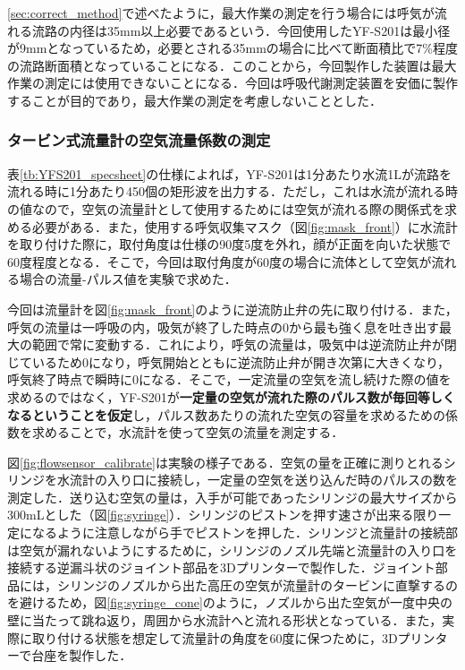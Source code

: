 \ref{sec:correct_method}で述べたように，最大作業の測定を行う場合には呼気が流れる流路の内径は35mm以上必要であるという．今回使用したYF-S201は最小径が9mmとなっているため，必要とされる35mmの場合に比べて断面積比で7\%程度の流路断面積となっていることになる．このことから，今回製作した装置は最大作業の測定には使用できないことになる．今回は呼吸代謝測定装置を安価に製作することが目的であり，最大作業の測定を考慮しないこととした．

\subsubsection{タービン式流量計の空気流量係数の測定}
\label{sec:measuring_coefficient}

表\ref{tb:YFS201_specsheet}の仕様によれば，YF-S201は1分あたり水流1Lが流路を流れる時に1分あたり450個の矩形波を出力する．ただし，これは水流が流れる時の値なので，空気の流量計として使用するためには空気が流れる際の関係式を求める必要がある．また，使用する呼気収集マスク（図\ref{fig:mask_front}）に水流計を取り付けた際に，取付角度は仕様の90度\pm5度を外れ，顔が正面を向いた状態で60度程度となる．そこで，今回は取付角度が60度の場合に流体として空気が流れる場合の流量-パルス値を実験で求めた．

今回は流量計を図\ref{fig:mask_front}のように逆流防止弁の先に取り付ける．また，呼気の流量は一呼吸の内，吸気が終了した時点の0から最も強く息を吐き出す最大の範囲で常に変動する．これにより，呼気の流量は，吸気中は逆流防止弁が閉じているため0になり，呼気開始とともに逆流防止弁が開き次第に大きくなり，呼気終了時点で瞬時に0になる．そこで，一定流量の空気を流し続けた際の値を求めるのではなく，YF-S201が{\bf 一定量の空気が流れた際のパルス数が毎回等しくなるということを仮定}し，パルス数あたりの流れた空気の容量を求めるための係数を求めることで，水流計を使って空気の流量を測定する．

図\ref{fig:flowsensor_calibrate}は実験の様子である．空気の量を正確に測りとれるシリンジを水流計の入り口に接続し，一定量の空気を送り込んだ時のパルスの数を測定した．送り込む空気の量は，入手が可能であったシリンジの最大サイズから300mLとした（図\ref{fig:syringe}）．シリンジのピストンを押す速さが出来る限り一定になるように注意しながら手でピストンを押した．シリンジと流量計の接続部は空気が漏れないようにするために，シリンジのノズル先端と流量計の入り口を接続する逆漏斗状のジョイント部品を3Dプリンターで製作した．ジョイント部品には，シリンジのノズルから出た高圧の空気が流量計のタービンに直撃するのを避けるため，図\ref{fig:syringe_cone}のように，ノズルから出た空気が一度中央の壁に当たって跳ね返り，周囲から水流計へと流れる形状となっている．また，実際に取り付ける状態を想定して流量計の角度を60度に保つために，3Dプリンターで台座を製作した．

